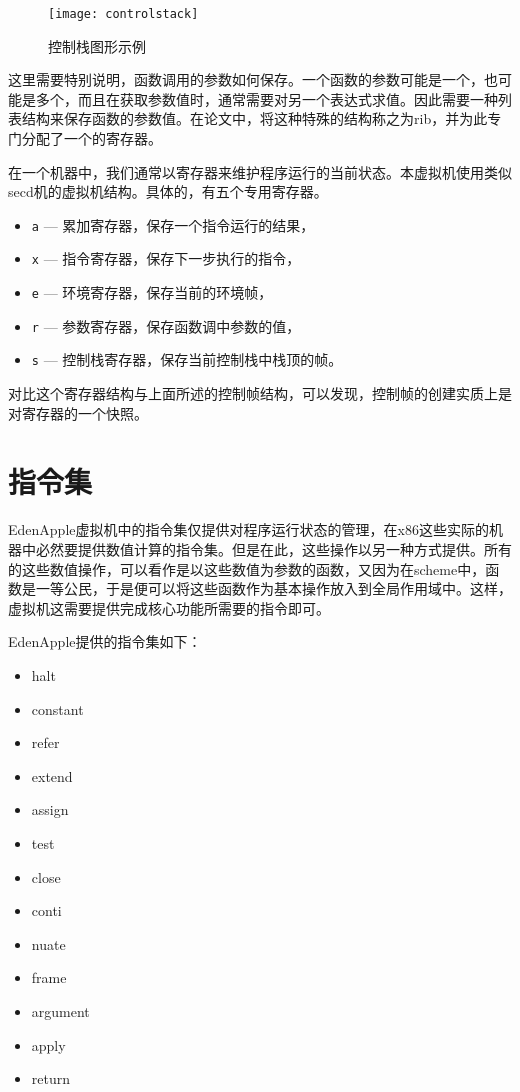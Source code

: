 \begin{figure}
\begin{center}
\texttt{[image: controlstack]}
\end{center}
\caption{控制栈图形示例}
\label{fig:control stack sample}
\end{figure}

这里需要特别说明，函数调用的参数如何保存。一个函数的参数可能是一个，也可能是多个，而且在获取参数值时，通常需要对另一个表达式求值。因此需要一种列表结构来保存函数的参数值。在论文中，将这种特殊的结构称之为rib，并为此专门分配了一个的寄存器。

在一个机器中，我们通常以寄存器来维护程序运行的当前状态。本虚拟机使用类似secd机的虚拟机结构。具体的，有五个专用寄存器。

\begin{itemize}
\item \texttt{a} --- 累加寄存器，保存一个指令运行的结果，
\item \texttt{x} --- 指令寄存器，保存下一步执行的指令，
\item \texttt{e} --- 环境寄存器，保存当前的环境帧，
\item \texttt{r} --- 参数寄存器，保存函数调中参数的值，
\item \texttt{s} --- 控制栈寄存器，保存当前控制栈中栈顶的帧。
\end{itemize}

对比这个寄存器结构与上面所述的控制帧结构，可以发现，控制帧的创建实质上是对寄存器的一个快照。

\section{指令集}

EdenApple虚拟机中的指令集仅提供对程序运行状态的管理，在x86这些实际的机器中必然要提供数值计算的指令集。但是在此，这些操作以另一种方式提供。所有的这些数值操作，可以看作是以这些数值为参数的函数，又因为在scheme中，函数是一等公民，于是便可以将这些函数作为基本操作放入到全局作用域中。这样，虚拟机这需要提供完成核心功能所需要的指令即可。

EdenApple提供的指令集如下：

{
\singlespacing
\fontsize{10}{10}
\ttfamily
\begin{itemize}
\item halt
\item constant
\item refer
\item extend
\item assign
\item test
\item close
\item conti
\item nuate
\item frame
\item argument
\item apply
\item return
\end{itemize}
}

